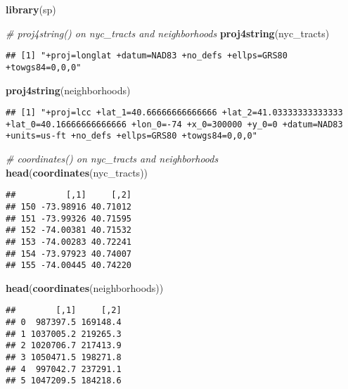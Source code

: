 \documentclass[]{article}
\newenvironment{Shaded}{\begin{snugshade}}{\end{snugshade}}
\newcommand{\CommentTok}[1]{\textcolor[rgb]{0.56,0.35,0.01}{\textit{#1}}}
\newcommand{\KeywordTok}[1]{\textcolor[rgb]{0.13,0.29,0.53}{\textbf{#1}}}
\newcommand{\NormalTok}[1]{#1}
\begin{document}
\begin{Shaded}
\begin{Highlighting}[]
\KeywordTok{library}\NormalTok{(sp)}

\CommentTok{# proj4string() on nyc_tracts and neighborhoods}
\KeywordTok{proj4string}\NormalTok{(nyc_tracts)}
\end{Highlighting}
\end{Shaded}

\begin{verbatim}
## [1] "+proj=longlat +datum=NAD83 +no_defs +ellps=GRS80 +towgs84=0,0,0"
\end{verbatim}

\begin{Shaded}
\begin{Highlighting}[]
\KeywordTok{proj4string}\NormalTok{(neighborhoods)}
\end{Highlighting}
\end{Shaded}

\begin{verbatim}
## [1] "+proj=lcc +lat_1=40.66666666666666 +lat_2=41.03333333333333 +lat_0=40.16666666666666 +lon_0=-74 +x_0=300000 +y_0=0 +datum=NAD83 +units=us-ft +no_defs +ellps=GRS80 +towgs84=0,0,0"
\end{verbatim}

\begin{Shaded}
\begin{Highlighting}[]
\CommentTok{# coordinates() on nyc_tracts and neighborhoods}
\KeywordTok{head}\NormalTok{(}\KeywordTok{coordinates}\NormalTok{(nyc_tracts))}
\end{Highlighting}
\end{Shaded}

\begin{verbatim}
##          [,1]     [,2]
## 150 -73.98916 40.71012
## 151 -73.99326 40.71595
## 152 -74.00381 40.71532
## 153 -74.00283 40.72241
## 154 -73.97923 40.74007
## 155 -74.00445 40.74220
\end{verbatim}

\begin{Shaded}
\begin{Highlighting}[]
\KeywordTok{head}\NormalTok{(}\KeywordTok{coordinates}\NormalTok{(neighborhoods))}
\end{Highlighting}
\end{Shaded}

\begin{verbatim}
##        [,1]     [,2]
## 0  987397.5 169148.4
## 1 1037005.2 219265.3
## 2 1020706.7 217413.9
## 3 1050471.5 198271.8
## 4  997042.7 237291.1
## 5 1047209.5 184218.6
\end{verbatim}
\end{document}
